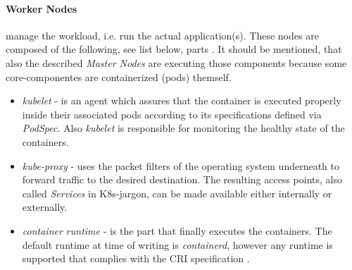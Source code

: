 \documentclass[MSC,Master,english]{twbook}%
\begin{document}
\paragraph{Worker Nodes} manage the workload, i.e. run the actual application(s). These nodes are composed of the following, see list below, parts \cite{k8scomp}. It should be mentioned, that also the described \textit{Master Nodes} are executing those components because some core-componentes are containerized (pods) themself. 
\begin{itemize}
    \item \textit{kubelet} - is an agent which assures that the container is executed properly inside their associated pods according to its specifications defined via \textit{PodSpec}. Also \textit{kubelet} is responsible for monitoring the healthy state of the containers.
    \item \textit{kube-proxy} - uses the packet filters of the operating system underneath to forward traffic to the desired destination. The resulting access points, also called \textit{Services} in \ac{K8s}-jargon, can be made available either internally or externally.
    \item \textit{container runtime} - is the part that finally executes the containers. The default runtime at time of writing is \textit{containerd}, however any runtime is supported that complies with the CRI specification \cite{cri-runtime}.
\end{itemize}
\end{document}
